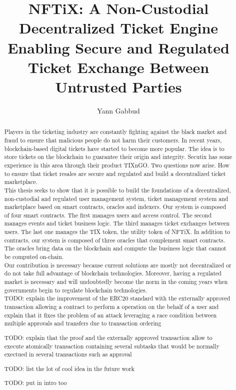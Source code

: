 \documentclass[a4paper,11pt,oneside]{report}
\title{NFTiX: A Non-Custodial Decentralized Ticket Engine Enabling Secure and Regulated Ticket Exchange Between Untrusted Parties}
\author{Yann Gabbud}
\affiliation{Distributed Computing Laboratory \\
and \\
Secutix SA, an ELCA company \\}
\begin{document}
\maketitle
\makeacks

\begin{abstract}
Players in the ticketing industry are constantly fighting against the black market and fraud to ensure that malicious people do not harm their customers. In recent years, blockchain-based digital tickets have started to become more popular. The idea is to store tickets on the blockchain to guarantee their origin and integrity. Secutix has some experience in this area through their product TIXnGO. Two questions now arise. How to ensure that ticket resales are secure and regulated and build a decentralized ticket marketplace. \\

This thesis seeks to show that it is possible to build the foundations of a decentralized, non-custodial and regulated user management system, ticket management system and marketplace based on smart contracts, oracles and indexers. Our system is composed of four smart contracts. The first manages users and access control. The second manages events and ticket business logic. The third manages ticket exchanges between users. The last one manages the TIX token, the utility token of NFTiX. In addition to contracts, our system is composed of three oracles that complement smart contracts. The oracles bring data on the blockchain and compute the business logic that cannot be computed on-chain. \\

Our contribution is necessary because current solutions are mostly not decentralized or do not take full advantage of blockchain technologies. Moreover, having a regulated market is necessary and will undoubtedly become the norm in the coming years when governments begin to regulate blockchain technologies. \\

TODO: explain the improvement of the ERC20 standard with the externally approved transaction allowing a contract to perform a operation on the behalf of a user and explain that it fixes the problem of an attack leveraging a race condition between multiple approvals and transfers due to transaction ordering 

TODO: explain that the proof and the externally approved transaction allow to execute atomically transaction containing several subtasks that would be normally exectued in several transactions such as approval

TODO: list the lot of cool idea in the future work

TODO: put in intro too

\end{abstract}
\end{document}
